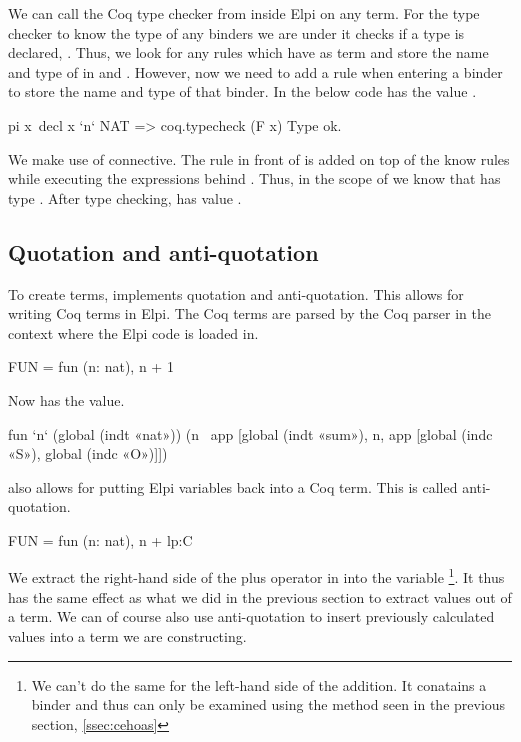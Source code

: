 \documentclass[thesis.tex]{subfiles}
\begin{document}
{{{{We can call the Coq type checker from inside Elpi on any term. For the type checker to know the type of any binders we are under it checks if a type is declared, . Thus, we look for any  rules which have as term  and store the name and type of  in  and . However, now we need to add a rule when entering a binder to store the name and type of that binder. In the below code  has the value .
\begin{elpicode}
  pi x\ decl x `n` NAT
          => coq.typecheck (F x) Type ok.
\end{elpicode}
We make use of \elpii{=>} connective. The rule in front of \elpii{=>} is added on top of the know rules while executing the expressions behind \elpii{=>}. Thus, in the scope of  we know that  has type . After type checking,  has value .

\subsection{Quotation and anti-quotation}\label{ssec:ceqoute}
To create terms, \ce implements quotation and anti-quotation. This allows for writing Coq terms in Elpi. The Coq terms are parsed by the Coq parser in the context where the Elpi code is loaded in.
\begin{elpicode}
  FUN = {{ fun (n: nat), n + 1 }}
\end{elpicode}
Now  has the value.
\begin{elpicode}
  fun `n` (global (indt «nat»)) 
            (n \ app [global (indt «sum»), 
                      n, app [global (indc «S»), 
                              global (indc «O»)]])
\end{elpicode}
\ce also allows for putting Elpi variables back into a Coq term. This is called anti-quotation.
\begin{elpicode}
  FUN = {{ fun (n: nat), n + lp:C }}
\end{elpicode}
We extract the right-hand side of the plus operator in  into the variable \footnote{We can't do the same for the left-hand side of the addition. It conatains a binder and thus can only be examined using the method seen in the previous section, \cref{ssec:cehoas}}. It thus has the same effect as what we did in the previous section to extract values out of a term. We can of course also use anti-quotation to insert previously calculated values into a term we are constructing.

}}}}
\end{document}
